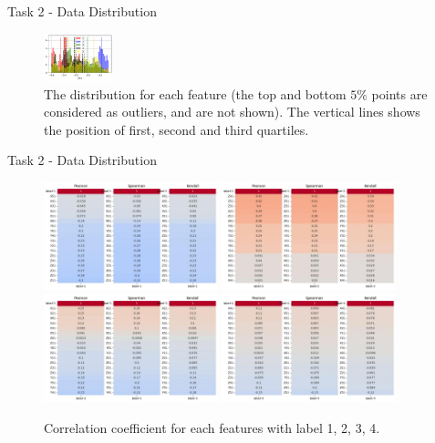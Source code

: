 \documentclass{beamer}
\begin{document}
\begin{frame}{Task 2 - Data Distribution}
\begin{figure}[H]
    \includegraphics[width=0.18\textwidth]{../code/Task2/Analysis/Hist-Z51}
    \caption{The distribution for each feature (the top and bottom $5\%$ points are considered as outliers, and are not shown). The vertical lines shows the position of first, second and third quartiles.}
  \end{figure}

\end{frame}

\begin{frame}{Task 2 - Data Distribution}

  \begin{figure}[H]
    \centering
    \includegraphics[width=0.45\textwidth]{../code/Task2/Analysis/corrcoef-1.jpg}
    \includegraphics[width=0.45\textwidth]{../code/Task2/Analysis/corrcoef-2.jpg} \\
    \includegraphics[width=0.45\textwidth]{../code/Task2/Analysis/corrcoef-3.jpg}
    \includegraphics[width=0.45\textwidth]{../code/Task2/Analysis/corrcoef-4.jpg} \\
    \caption{Correlation coefficient for each features with label 1, 2, 3, 4.}
  \end{figure}

\end{frame}
\end{document}

